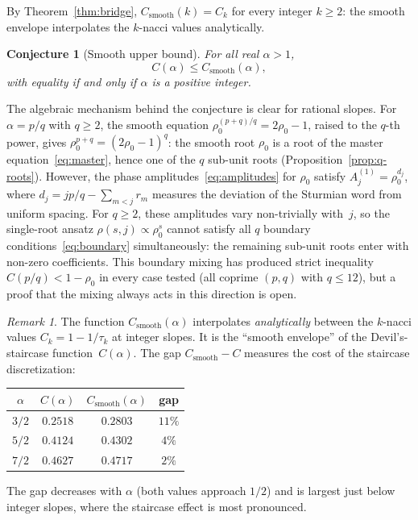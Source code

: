 \documentclass[11pt]{article}
\newtheorem{conjecture}[theorem]{Conjecture}
\theoremstyle{definition}
\theoremstyle{remark}
\newtheorem{remark}[theorem]{Remark}
\begin{document}
By Theorem~\ref{thm:bridge}, $C_{\mathrm{smooth}}(k) = C_k$ for every
integer $k \geq 2$: the smooth envelope interpolates the $k$-nacci
values analytically.

\begin{conjecture}[Smooth upper bound]\label{conj:upper-bound}
For all real $\alpha > 1$,
\[
C(\alpha) \leq C_{\mathrm{smooth}}(\alpha),
\]
with equality if and only if $\alpha$ is a positive integer.
\end{conjecture}

The algebraic mechanism behind the conjecture is clear for rational
slopes.
For $\alpha = p/q$ with $q \geq 2$, the smooth equation
$\rho_0^{(p+q)/q} = 2\rho_0 - 1$, raised to the $q$-th power, gives
$\rho_0^{p+q} = (2\rho_0 - 1)^q$: the smooth root $\rho_0$ is a
root of the master equation~\eqref{eq:master}, hence one of the $q$
sub-unit roots (Proposition~\ref{prop:q-roots}).
However, the phase amplitudes~\eqref{eq:amplitudes} for $\rho_0$
satisfy $A_j^{(1)} = \rho_0^{d_j}$, where
$d_j = jp/q - \sum_{m<j} r_m$ measures the deviation of the Sturmian
word from uniform spacing.
For $q \geq 2$, these amplitudes vary non-trivially with~$j$, so
the single-root ansatz $\rho(s, j) \propto \rho_0^s$ cannot satisfy
all $q$ boundary conditions~\eqref{eq:boundary} simultaneously:
the remaining sub-unit roots enter with non-zero coefficients.
This boundary mixing has produced strict inequality
$C(p/q) < 1 - \rho_0$ in every case tested
(all coprime $(p, q)$ with $q \leq 12$), but a proof that the
mixing always acts in this direction is open.

\begin{remark}
The function $C_{\mathrm{smooth}}(\alpha)$ interpolates
\emph{analytically} between the $k$-nacci values
$C_k = 1 - 1/\tau_k$ at integer slopes.
It is the ``smooth envelope'' of the Devil's-staircase
function~$C(\alpha)$.
The gap $C_{\mathrm{smooth}} - C$ measures the cost of the
staircase discretization:
\begin{center}
\begin{tabular}{cccc}
\toprule
$\alpha$ & $C(\alpha)$ & $C_{\mathrm{smooth}}(\alpha)$ & gap \\
\midrule
$3/2$ & $0.2518$ & $0.2803$ & $11\%$ \\
$5/2$ & $0.4124$ & $0.4302$ & $4\%$ \\
$7/2$ & $0.4627$ & $0.4717$ & $2\%$ \\
\bottomrule
\end{tabular}
\end{center}
The gap decreases with $\alpha$ (both values approach $1/2$) and
is largest just below integer slopes, where the staircase effect
is most pronounced.
\end{remark}
\end{document}

